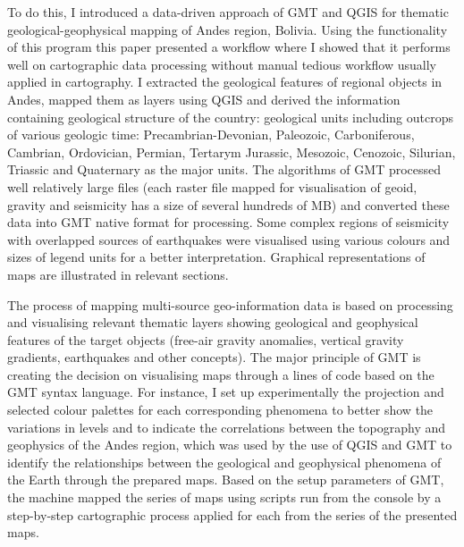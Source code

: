 \documentclass[data,article,submit,pdftex,moreauthors]{Definitions/mdpi}
\begin{document}
To do this, I introduced a data-driven approach of GMT and QGIS for thematic geological-geophysical mapping of Andes region, Bolivia. Using the functionality of this program this paper presented a workflow where I showed that it performs well on cartographic data processing without manual tedious workflow usually applied in cartography. I extracted the geological features of regional objects in Andes, mapped them as layers using QGIS and derived the information containing geological structure of the country: geological units including outcrops of various geologic time: Precambrian-Devonian, Paleozoic, Carboniferous, Cambrian, Ordovician, Permian, Tertarym Jurassic, Mesozoic, Cenozoic, Silurian, Triassic and Quaternary as the major units. The algorithms of GMT processed well relatively large files (each raster file mapped for visualisation of geoid, gravity and seismicity has a size of several hundreds of MB) and converted these data into GMT native format for processing. Some complex regions of seismicity with overlapped sources of earthquakes were visualised using various colours and sizes of legend units for a better interpretation. Graphical representations of maps are illustrated in relevant sections. 

The process of mapping multi-source geo-information data is based on processing and visualising relevant thematic layers showing geological and geophysical features of the target objects (free-air gravity anomalies, vertical gravity gradients, earthquakes and other concepts). The major principle of GMT is creating the decision on visualising maps through a lines of code based on the GMT syntax language. For instance, I set up experimentally the projection and selected colour palettes for each corresponding phenomena to better show the variations in levels and to indicate the correlations between the topography and geophysics of the Andes region, which was used by the use of QGIS and GMT to identify the relationships between the geological and geophysical phenomena of the Earth through the prepared maps. Based on the setup parameters of GMT, the machine mapped the series of maps using scripts run from the console by a step-by-step cartographic process applied for each from the series of the presented maps.
\end{document}
